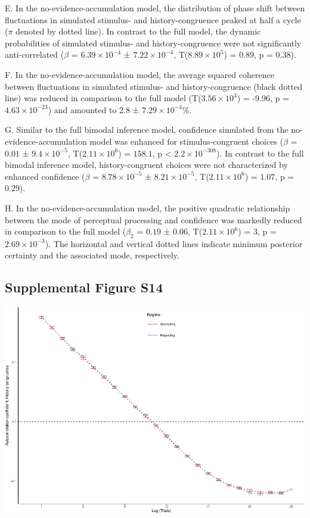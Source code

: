 \documentclass[
]{article}
\begin{document}
E. In the no-evidence-accumulation model, the distribution of phase
shift between fluctuations in simulated stimulus- and history-congruence
peaked at half a cycle (\(\pi\) denoted by dotted line). In contrast to
the full model, the dynamic probabilities of simulated stimulus- and
history-congruence were not significantly anti-correlated (\(\beta\) =
\(\ensuremath{6.39\times 10^{-4}}\) ±
\(\ensuremath{7.22\times 10^{-4}}\),
T(\(\ensuremath{8.89\times 10^{5}}\)) = \(0.89\), p = \(0.38\)).

F. In the no-evidence-accumulation model, the average squared coherence
between fluctuations in simulated stimulus- and history-congruence
(black dotted line) was reduced in comparison to the full model
(T(\ensuremath{3.56\times 10^{3}}) = -9.96, p =
\(\ensuremath{4.63\times 10^{-23}}\)) and amounted to 2.8 ±
\ensuremath{7.29\times 10^{-4}}\%.

G. Similar to the full bimodal inference model, confidence simulated
from the no-evidence-accumulation model was enhanced for
stimulus-congruent choices (\(\beta\) = \(0.01\) ±
\(\ensuremath{9.4\times 10^{-5}}\),
T(\(\ensuremath{2.11\times 10^{6}}\)) = \(158.1\), p < \(\ensuremath{2.2\times 10^{-308}}\)). In
contrast to the full bimodal inference model, history-congruent choices
were not characterized by enhanced confidence (\(\beta\) =
\(\ensuremath{8.78\times 10^{-5}}\) ±
\(\ensuremath{8.21\times 10^{-5}}\),
T(\(\ensuremath{2.11\times 10^{6}}\)) = \(1.07\), p = \(0.29\)).

H. In the no-evidence-accumulation model, the positive quadratic
relationship between the mode of perceptual processing and confidence
was markedly reduced in comparison to the full model (\(\beta_2\) =
\(0.19\) ± \(0.06\), T(\(\ensuremath{2.11\times 10^{6}}\)) = \(3\), p =
\(\ensuremath{2.69\times 10^{-3}}\)). The horizontal and vertical dotted
lines indicate minimum posterior certainty and the associated mode,
respectively.

\newpage

\hypertarget{supplemental-figure-s14}{%
\subsection{Supplemental Figure S14}\label{supplemental-figure-s14}}

\includegraphics{modes_mouse_rev1b_files/figure-latex/Supplemental_Figure_S14-1.pdf}
\end{document}
